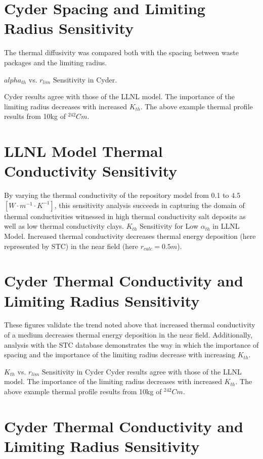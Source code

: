 \documentclass[letterpaper]{article}
\begin{document}
\begin{frame}[ctb!]
\section*{Cyder Spacing and Limiting Radius Sensitivity}
  The thermal diffusivity was compared both with the 
  spacing between waste packages and the limiting radius. 

  $alpha_{th}$ vs. $r_{lim}$ Sensitivity in Cyder.

  Cyder results agree with those of the LLNL model. The importance of the 
  limiting radius decreases with increased $K_{th}$. The above example thermal 
  profile results from 10kg of $^{242}Cm$.

\section*{LLNL Model Thermal Conductivity Sensitivity}
By varying the thermal conductivity of the repository model from 0.1 to 4.5 
$[W\cdot m^{-1} \cdot K^{-1}]$, this sensitivity analysis succeeds in capturing 
the domain of thermal conductivities witnessed in high thermal conductivity 
salt deposits as well as low thermal conductivity clays.
$K_{th}$ Sensitivity for Low $\alpha_{th}$ in LLNL Model.
Increased thermal conductivity decreases thermal energy deposition 
(here represented by STC) in the near field (here $r_{calc} = 0.5m$).

\section*{Cyder Thermal Conductivity and Limiting Radius Sensitivity}

These figures validate the trend noted above that 
increased thermal conductivity of a medium decreases thermal energy deposition 
in the near field. Additionally, analysis with the \Cyder STC database 
demonstrates the way in which the importance of spacing and the importance of 
the limiting radius decrease with increasing $K_{th}$.

$K_{th}$ vs. $r_{lim}$ Sensitivity in Cyder
Cyder results agree with 
those of the LLNL model. The importance of the limiting radius decreases with 
increased $K_{th}$. The above example thermal profile results from 10kg of 
$^{242}Cm$.

\section*{Cyder Thermal Conductivity and Limiting Radius Sensitivity}


\end{frame}
\end{document}
